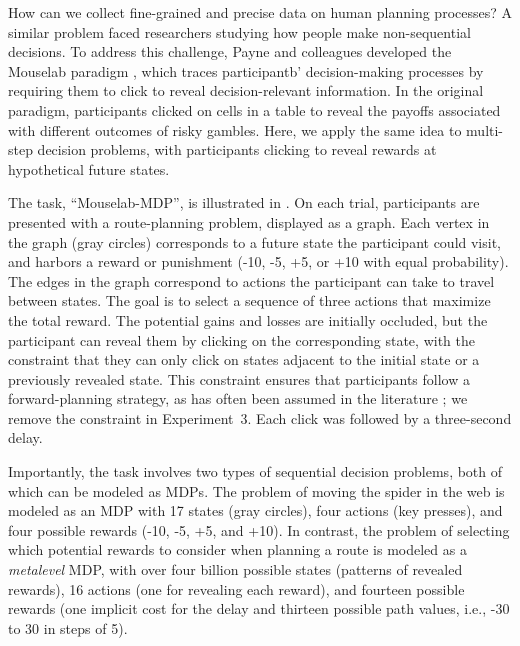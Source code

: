 How can we collect fine-grained and precise data on human planning processes? A similar problem faced researchers studying how people make non-sequential decisions. To address this challenge, Payne and colleagues developed the Mouselab paradigm \citep{payne1976task,payne1988adaptive}, which traces participantb' decision-making processes by requiring them to click to reveal decision-relevant information. In the original paradigm, participants clicked on cells in a table to reveal the payoffs associated with different outcomes of risky gambles. Here, we apply the same idea to multi-step decision problems, with participants clicking to reveal rewards at hypothetical future states.


The task, ``Mouselab-MDP'', is illustrated in . On each trial, participants are presented with a route-planning problem, displayed as a graph. Each vertex in the graph (gray circles) corresponds to a future state the participant could visit, and harbors a reward or punishment (-10, -5, +5, or +10 with equal probability). The edges in the graph correspond to actions the participant can take to travel between states. The goal is to select a sequence of three actions that maximize the total reward. The potential gains and losses are initially occluded, but the participant can reveal them by clicking on the corresponding state, with the constraint that they can only click on states adjacent to the initial state or a previously revealed state. This constraint ensures that participants follow a forward-planning strategy, as has often been assumed in the literature \citep{huys2015interplay,huys2012bonsai,vanopheusden2017computational,macgregor2001information,keramati2016adaptive,krusche2018adaptive,snider2015prospective}; we remove the constraint in Experiment~3. Each click was followed by a three-second delay.

Importantly, the task involves two types of sequential decision problems, both of which can be modeled as MDPs. The problem of moving the spider in the web is modeled as an MDP with 17 states (gray circles), four actions (key presses), and four possible rewards (-10, -5, +5, and +10). In contrast, the problem of selecting which potential rewards to consider when planning a route is modeled as a \emph{metalevel} MDP, with over four billion possible states (patterns of revealed rewards), 16 actions (one for revealing each reward), and fourteen possible rewards (one implicit cost for the delay and thirteen possible path values, i.e., -30 to 30 in steps of 5).

